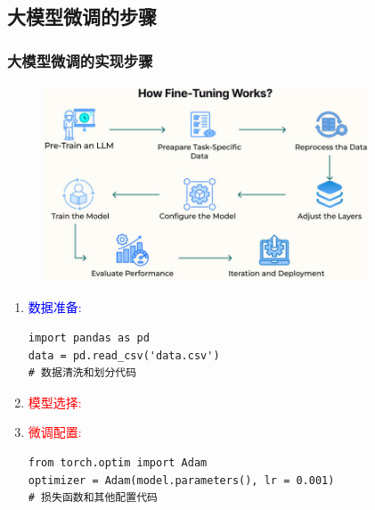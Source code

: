 \subsection{大模型微调的步骤}
\begin{frame}
    \frametitle{大模型微调的实现步骤}
\begin{figure}[h!]
\vspace*{-0.05in}
\centering
\includegraphics[height=2.3in, width=3.8in, viewport=0 0 210 118,clip]{Figures/How-Fine-Tuning-Works.jpg}
\label{How-Fine-Tuning-Works}
\end{figure}
    \begin{enumerate}
	    \item \textcolor{blue}{数据准备:}\\
		    {\fontsize{7.2pt}{6.2pt}\selectfont{收集标注特定领域数据，进行清洗和预处理，划分训练集、验证集和测试集}}
            \begin{lstlisting}[style=pythonstyle]
import pandas as pd
data = pd.read_csv('data.csv')
# 数据清洗和划分代码
            \end{lstlisting}
    \item \textcolor{red}{模型选择:}\\
	    {\fontsize{7.2pt}{6.2pt}\selectfont{根据任务需求和数据特点选择预训练模型，考虑模型大小、性能和可扩展性优先选择任务适配、参数规模合适的模型}}
    \item \textcolor{red}{微调配置:}\\
	    {\fontsize{7.2pt}{6.2pt}\selectfont{设置训练参数，如学习率、批量大小、训练轮数，选择优化器和损失函数}}
            \begin{lstlisting}[style=pythonstyle]
from torch.optim import Adam
optimizer = Adam(model.parameters(), lr = 0.001)
# 损失函数和其他配置代码

\end{lstlisting}
\end{enumerate}
\end{frame}

